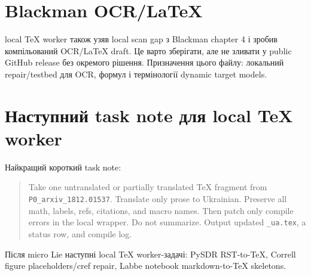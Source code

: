 \section{Blackman OCR/LaTeX}

local TeX worker також узяв local scan gap з Blackman chapter 4 і зробив компільований OCR/LaTeX draft. Це варто зберігати, але не зливати у public GitHub release без окремого рішення. Призначення цього файлу: локальний repair/testbed для OCR, формул і термінології dynamic target models.

\section{Наступний task note для local TeX worker}

Найкращий короткий task note:
\begin{quote}
Take one untranslated or partially translated TeX fragment from \texttt{P0\_arxiv\_1812.01537}. Translate only prose to Ukrainian. Preserve all math, labels, refs, citations, and macro names. Then patch only compile errors in the local wrapper. Do not summarize. Output updated \texttt{\_ua.tex}, a status row, and compile log.
\end{quote}

Після micro Lie наступні local TeX worker-задачі: PySDR RST-to-TeX, Correll figure placeholders/cref repair, Labbe notebook markdown-to-TeX skeletons.
